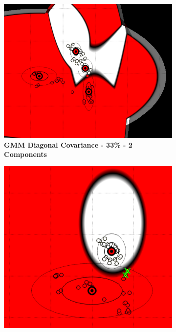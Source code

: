 \begin{figure} [ht]
\centering
	\begin{subfigure}[h]{0.30\textwidth}
    \centering
	\includegraphics[height=0.08\textheight]{./classification/gmm_diag_cov_33pourcent_2gmm.png}
	\caption{\bf GMM Diagonal Covariance - 33\% - 2 Components}
	\end{subfigure}
    \hspace{3mm}
    \begin{subfigure}[h]{0.3\textwidth}
    \centering
    \includegraphics[height=0.08\textheight]{./classification/gmm_diag_cov_100pourcent_1gmm.png}

\end{subfigure}
\end{figure}
